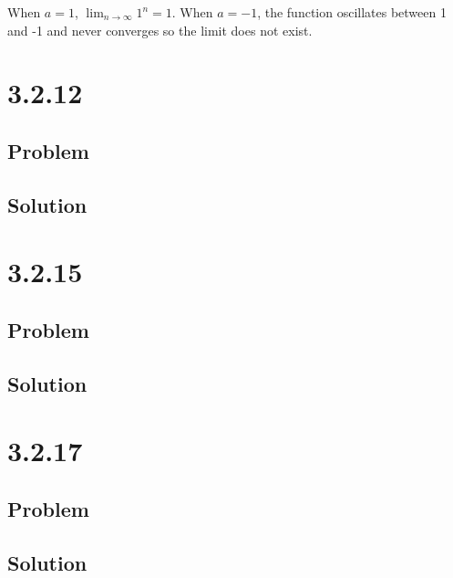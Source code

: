 \documentclass[12pt]{article}
\begin{document}
When $a = 1$, $\lim_{n \to \infty} 1^n = 1$. When $a = -1$, the function oscillates between 1 and -1 and never converges so the limit does not exist.



\section*{3.2.12}

\subsection*{Problem}

\subsection*{Solution}



\section*{3.2.15}

\subsection*{Problem}

\subsection*{Solution}



\section*{3.2.17}

\subsection*{Problem}

\subsection*{Solution}
\end{document}
